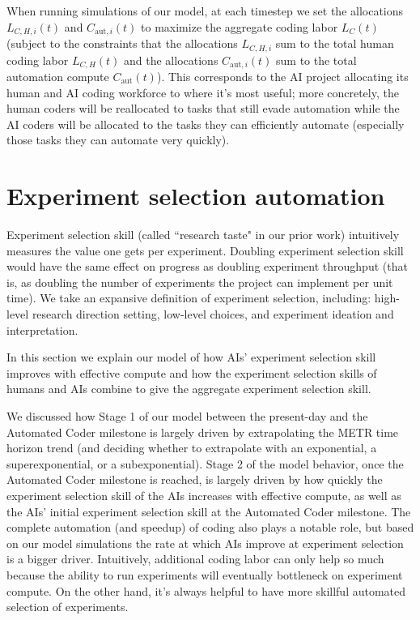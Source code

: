 \documentclass{article}
\theoremstyle{definition}
\begin{document}
When running simulations of our model, at each timestep we set the allocations $L_{C,H,i}(t)$ and $C_{\text{aut},i}(t)$ to maximize the aggregate coding labor $L_C(t)$ (subject to the constraints that the allocations $L_{C,H,i}$ sum to the total human coding labor $L_{C,H}(t)$ and the allocations $C_{\text{aut},i}(t)$ sum to the total automation compute $C_{\text{aut}}(t)$). This corresponds to the AI project allocating its human and AI coding workforce to where it's most useful; more concretely, the human coders will be reallocated to tasks that still evade automation while the AI coders will be allocated to the tasks they can efficiently automate (especially those tasks they can automate very quickly).

\section{Experiment selection automation}\label{Experiment selection automation}

Experiment selection skill (called ``research taste" in our prior work) intuitively measures the value one gets per experiment. Doubling experiment selection skill would have the same effect on progress as doubling experiment throughput (that is, as doubling the number of experiments the project can implement per unit time). We take an expansive definition of experiment selection, including: high-level research direction setting, low-level choices, and experiment ideation and interpretation. 

In this section we explain our model of how AIs' experiment selection skill improves with effective compute and how the experiment selection skills of humans and AIs combine to give the aggregate experiment selection skill. 

We discussed how Stage 1 of our model between the present-day and the Automated Coder milestone is largely driven by extrapolating the METR time horizon trend (and deciding whether to extrapolate with an exponential, a superexponential, or a subexponential). Stage 2 of the model behavior, once the Automated Coder milestone is reached, is largely driven by how quickly the experiment selection skill of the AIs increases with effective compute, as well as the AIs' initial experiment selection skill at the Automated Coder milestone. The complete automation (and speedup) of coding also plays a notable role, but based on our model simulations the rate at which AIs improve at experiment selection is a bigger driver. Intuitively, additional coding labor can only help so much because the ability to run experiments will eventually bottleneck on experiment compute. On the other hand, it's always helpful to have more skillful automated selection of experiments.
\end{document}
